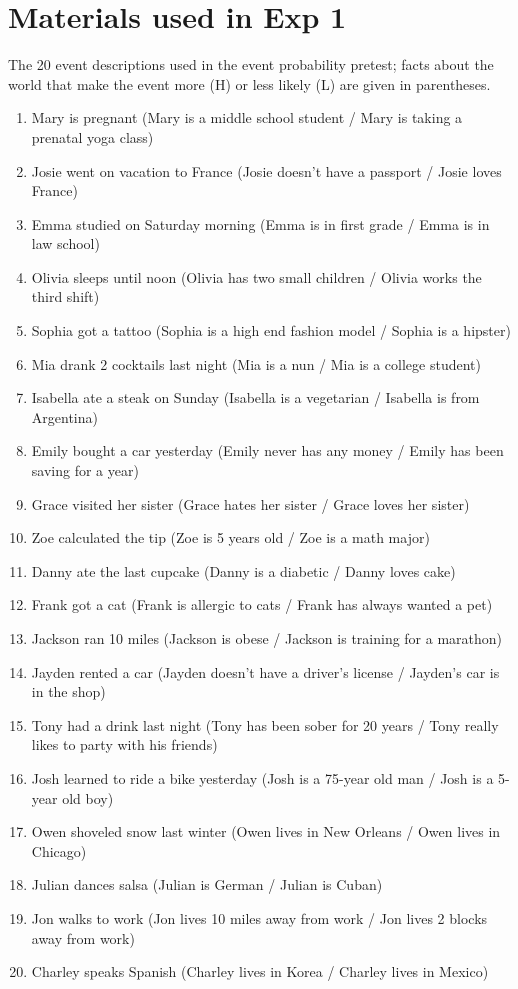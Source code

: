 \documentclass[11pt,fleqn]{article}
\newcommand{\6}{\mbox{$[\hspace*{-.6mm}[$}}
\newcommand{\9}{\mbox{$]\hspace*{-.6mm}]$}}
\begin{document}
\setcounter{figure}{0}
\renewcommand{\thefigure}{A\arabic{figure}}

\section{Materials used in Exp 1}\label{a-exp1}

The 20 event descriptions used in the event probability pretest; facts about the world that make the event more (H) or less likely (L) are given in parentheses. 

\begin{enumerate}[leftmargin=3ex,itemsep=-2pt]
\item Mary is pregnant (Mary is a middle school student / Mary is taking a prenatal yoga class)
\item Josie went on vacation to France (Josie doesn't have a passport / Josie loves France)
\item Emma studied on Saturday morning (Emma is in first grade / Emma is in law school)
\item Olivia sleeps until noon (Olivia has two small children / Olivia works the third shift)
\item Sophia got a tattoo (Sophia is a high end fashion model / Sophia is a hipster)
\item Mia drank 2 cocktails last night (Mia is a nun / Mia is a college student)
\item Isabella ate a steak on Sunday (Isabella is a vegetarian / Isabella is from Argentina)
\item  Emily bought a car yesterday (Emily never has any money / Emily has been saving for a year)
\item  Grace visited her sister (Grace hates her sister / Grace loves her sister)
\item Zoe calculated the tip (Zoe is 5 years old / Zoe is a math major)
\item  Danny ate the last cupcake (Danny is a diabetic / Danny loves cake)
\item  Frank got a cat (Frank is allergic to cats / Frank has always wanted a pet)
\item  Jackson ran 10 miles (Jackson is obese / Jackson is training for a marathon)
\item  Jayden rented a car (Jayden doesn't have a driver's license / Jayden's car is in the shop)
\item  Tony had a drink last night (Tony has been sober for 20 years / Tony really likes to party with his friends)
\item  Josh learned to ride a bike yesterday (Josh is a 75-year old man / Josh is a 5-year old boy)
\item  Owen shoveled snow last winter (Owen lives in New Orleans / Owen lives in Chicago)
\item  Julian dances salsa (Julian is German / Julian is Cuban)
\item  Jon walks to work (Jon lives 10 miles away from work / Jon lives 2 blocks away from work)
\item  Charley speaks Spanish (Charley lives in Korea / Charley lives in Mexico)
\end{enumerate}
\end{document}
